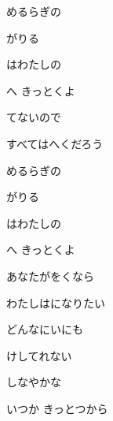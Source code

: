 \documentclass[14pt]{ltjsarticle}
\begin{document}
{  めるらぎの
  \jisho{}

  がりる
  \jisho{}

  はわたしの
  \jisho{}

  へ きっとくよ
  \jisho{}

\item
  てないので
  \jisho{}

  すべてはへくだろう
  \jisho{}

  めるらぎの
  \jisho{}

  がりる
  \jisho{}

  はわたしの
  \jisho{}

  へ きっとくよ
  \jisho{}

\item
  あなたがをくなら
  \jisho{}

  わたしはになりたい
  \jisho{}

  どんなにいにも
  \jisho{}

  けしてれない
  \jisho{}

  しなやかな
  \jisho{}

  いつか きっとつから
  \jisho{}

  
}
\end{document}
